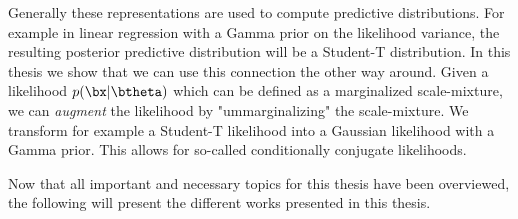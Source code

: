 Generally these representations are used to compute predictive distributions.
For example in linear regression with a Gamma prior on the likelihood variance, the resulting posterior predictive distribution will be a Student-T distribution.
In this thesis we show that we can use this connection the other way around.
Given a likelihood $p(\bx|\btheta)$ which can be defined as a marginalized scale-mixture,
we can \textit{augment} the likelihood by "ummarginalizing" the scale-mixture.
We transform for example a Student-T likelihood into a Gaussian likelihood with a Gamma prior.
This allows for so-called conditionally conjugate likelihoods.


Now that all important and necessary topics for this thesis have been overviewed, the following will present the different works presented in this thesis. 
